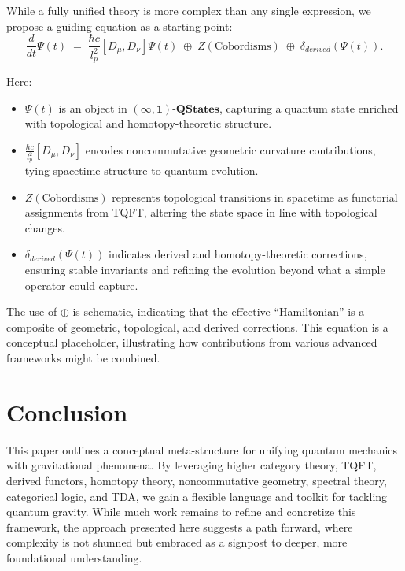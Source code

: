 \documentclass[12pt]{article}
\begin{document}
While a fully unified theory is more complex than any single expression, we propose a guiding equation as a starting point:
\[
\frac{d}{dt}\Psi(t) \;=\; \frac{\hbar c}{l_p^2}[D_\mu, D_\nu]\Psi(t) \;\oplus\; Z(\text{Cobordisms}) \;\oplus\; \delta_{derived}(\Psi(t)).
\]

Here:
\begin{itemize}
\item $\Psi(t)$ is an object in $\mathbf{(\infty,1)\text{-QStates}}$, capturing a quantum state enriched with topological and homotopy-theoretic structure.
\item $\frac{\hbar c}{l_p^2}[D_\mu, D_\nu]$ encodes noncommutative geometric curvature contributions, tying spacetime structure to quantum evolution.
\item $Z(\text{Cobordisms})$ represents topological transitions in spacetime as functorial assignments from TQFT, altering the state space in line with topological changes.
\item $\delta_{derived}(\Psi(t))$ indicates derived and homotopy-theoretic corrections, ensuring stable invariants and refining the evolution beyond what a simple operator could capture.
\end{itemize}

The use of $\oplus$ is schematic, indicating that the effective ``Hamiltonian'' is a composite of geometric, topological, and derived corrections. This equation is a conceptual placeholder, illustrating how contributions from various advanced frameworks might be combined.

\section{Conclusion}

This paper outlines a conceptual meta-structure for unifying quantum mechanics with gravitational phenomena. By leveraging higher category theory, TQFT, derived functors, homotopy theory, noncommutative geometry, spectral theory, categorical logic, and TDA, we gain a flexible language and toolkit for tackling quantum gravity. While much work remains to refine and concretize this framework, the approach presented here suggests a path forward, where complexity is not shunned but embraced as a signpost to deeper, more foundational understanding.
\end{document}
